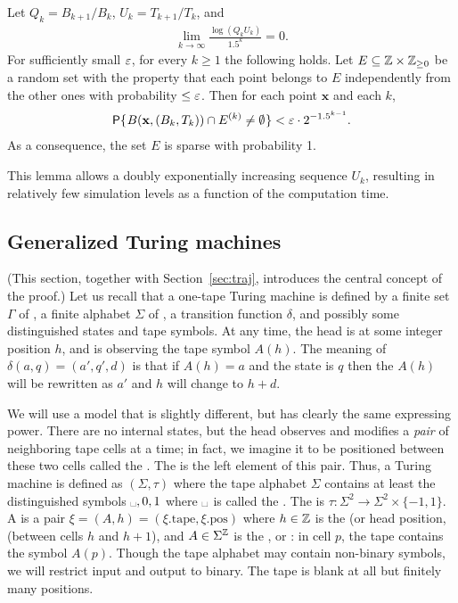 \documentclass[11pt]{memoir}
\theoremstyle{definition} %
\renewcommand{\le}{\leq}
\renewcommand{\ge}{\geq}
\renewcommand{\vek}[1]{\mathbf{#1}}
\def\B{B}
\def\U{U}
\newcommand{\blank}{\text{\textvisiblespace}}
\newcommand{\h}{h} %
\newcommand{\pos}{\mathrm{pos}}
\newcommand{\Q}{Q} %
\newcommand{\Tu}{T}
\newcommand{\tape}{\mathrm{tape}}
\newcommand{\x}{\vek{x}} %
\begin{document}
\begin{lemma}[Sparsity]\label{lem:sparsity}
Let \( \Q_{k} = \B_{k+1}/\B_{k} \),  \( \U_{k} = \Tu_{k+1}/\Tu_{k} \), and
\begin{align}\label{eq:growth-assumption}
  \lim_{k\rightarrow\infty}\frac{\log(\Q_{k}\U_{k})}{1.5^k}=0.
\end{align}
For sufficiently small \( \varepsilon \), for every \( k\ge 1 \) the following holds.
Let \( E\subseteq \bbZ\times\bbZ_{\ge 0} \)
be a random set with the property that each point belongs to \( E \)
independently from the other ones with probability \( \le \eps \).
Then for each point \( \x \)  and each \( k \),
 \begin{align*}
   \Pbof{B(\x,\pair{\B_{k}}{\Tu_{k}})\cap E^{(k)}\neq\emptyset} < \eps \cdot 2^{-1.5^{k-1}}.
 \end{align*}
As a consequence, the set \( E \) is sparse with probability 1.
\end{lemma}

This lemma allows a doubly exponentially increasing sequence \( \U_{k} \), resulting
in relatively few simulation levels as a function of the computation time.


\subsection{Generalized Turing machines}\label{sec:TM}

(This section, together with Section~\ref{sec:traj},
introduces the central concept of the proof.)
Let us recall that a one-tape Turing machine is defined by a
finite set \( \Gamma \) of ,
a finite alphabet \( \Sigma \) of , a transition function \( \delta \),
and possibly some distinguished states and tape symbols.
At any time, the head is at some integer position \( \h \), and is observing the tape
symbol \( A(\h) \).
The meaning of \( \delta(a,q)=(a',q',d) \) is that if \( A(\h)=a \) and the state is \( q \) then
the \( A(\h) \) will be rewritten as \( a' \) and \( \h \) will change to \( \h+d \).

We will use a model that is slightly different, but has clearly the same expressing power.
There are no internal states, but the head observes and modifies a \emph{pair} of
neighboring tape cells at a time; in fact, we imagine it to be positioned between these
two cells called the .
The  is the left element of this pair.
Thus, a Turing machine is defined as \(    (\Sigma,\tau) \) where
the tape alphabet \( \Sigma \) contains at least the distinguished
symbols \( \blank,0,1 \) where \( \blank \) is called the .
The  is
\(  \tau\colon\Sigma^{2}\to \Sigma^{2}\times\{-1,1\} \).
A  is a pair \( \xi = (A,\h) = (\xi.\tape,\xi.\pos) \)
where  \( \h\in\bbZ \) is the  (or 
head position, (between cells \( h \) and \( h+1 \)),
and \( A\in\Sigma^{\mathbb{Z}} \) is the , or :
in cell \( p \), the tape contains the symbol \( A(p) \).
Though the tape alphabet may contain
non-binary symbols, we will restrict input and output to binary.
The tape is blank at all but finitely many positions.
\end{document}
